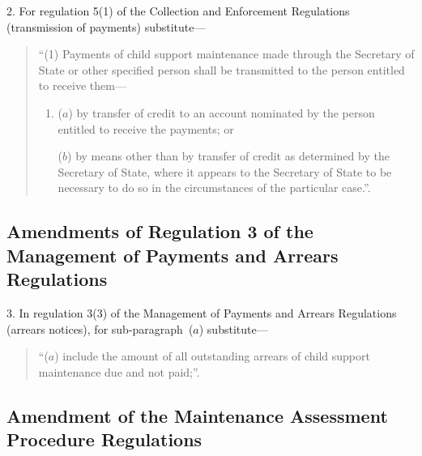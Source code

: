 \documentclass[12pt,a4paper]{article}
\begin{document}
2.  For regulation 5(1) of the Collection and Enforcement Regulations (transmission of payments) substitute---
\begin{quotation}
“(1) Payments of child support maintenance made through the Secretary of State or other specified person shall be transmitted to the person entitled to receive them---
\begin{enumerate}\item[]
($a$) by transfer of credit to an account nominated by the person entitled to receive the payments; or

($b$) by means other than by transfer of credit as determined by the Secretary of State, where it appears to the Secretary of State to be necessary to do so in the circumstances of the particular case.”.
\end{enumerate}
\end{quotation}

\subsection[3. Amendments of Regulation 3 of the Management of Payments and Arrears Regulations]{Amendments of Regulation 3 of the Management of Payments and Arrears Regulations}

3.  In regulation 3(3) of the Management of Payments and Arrears Regulations (arrears notices), for sub-paragraph~($a$)  substitute---
\begin{quotation}
“($a$) include the amount of all outstanding arrears of child support maintenance due and not paid;”.
\end{quotation}

\subsection[4. Amendment of the Maintenance Assessment Procedure Regulations]{Amendment of the Maintenance Assessment Procedure Regulations}
\end{document}
